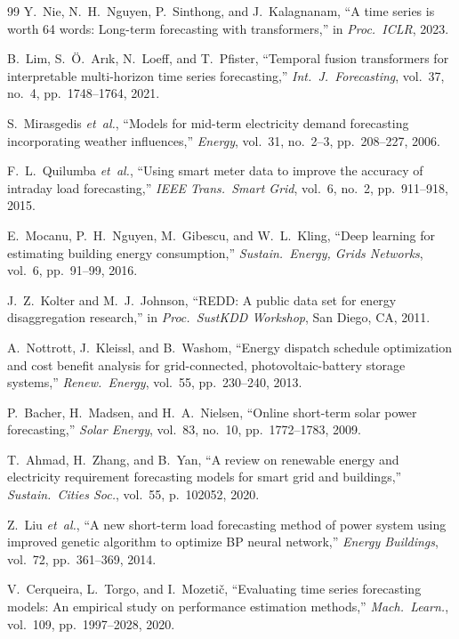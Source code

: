 \documentclass[12pt,a4paper]{article}
\begin{document}
\begin{thebibliography}{99}
Y.~Nie, N.~H.~Nguyen, P.~Sinthong, and J.~Kalagnanam, ``A time series is
worth 64 words: Long-term forecasting with transformers,'' in
\emph{Proc.~ICLR}, 2023.

B.~Lim, S.~{\"O}.~Ar{\i}k, N.~Loeff, and T.~Pfister, ``Temporal fusion
transformers for interpretable multi-horizon time series forecasting,''
\emph{Int.~J.~Forecasting}, vol.~37, no.~4, pp.~1748--1764, 2021.

S.~Mirasgedis \emph{et~al.}, ``Models for mid-term electricity demand
forecasting incorporating weather influences,'' \emph{Energy}, vol.~31,
no.~2--3, pp.~208--227, 2006.

F.~L.~Quilumba \emph{et~al.}, ``Using smart meter data to improve the accuracy
of intraday load forecasting,'' \emph{IEEE Trans.\ Smart Grid}, vol.~6, no.~2,
pp.~911--918, 2015.

E.~Mocanu, P.~H.~Nguyen, M.~Gibescu, and W.~L.~Kling, ``Deep learning for
estimating building energy consumption,'' \emph{Sustain.~Energy, Grids
Networks}, vol.~6, pp.~91--99, 2016.

J.~Z.~Kolter and M.~J.~Johnson, ``REDD: A public data set for energy
disaggregation research,'' in \emph{Proc.~SustKDD Workshop}, San Diego,
CA, 2011.

A.~Nottrott, J.~Kleissl, and B.~Washom, ``Energy dispatch schedule
optimization and cost benefit analysis for grid-connected, photovoltaic-battery
storage systems,'' \emph{Renew.~Energy}, vol.~55, pp.~230--240, 2013.

P.~Bacher, H.~Madsen, and H.~A.~Nielsen, ``Online short-term solar power
forecasting,'' \emph{Solar Energy}, vol.~83, no.~10, pp.~1772--1783, 2009.

T.~Ahmad, H.~Zhang, and B.~Yan, ``A review on renewable energy and electricity
requirement forecasting models for smart grid and buildings,''
\emph{Sustain.~Cities Soc.}, vol.~55, p.~102052, 2020.

Z.~Liu \emph{et~al.}, ``A new short-term load forecasting method of power
system using improved genetic algorithm to optimize BP neural network,''
\emph{Energy Buildings}, vol.~72, pp.~361--369, 2014.

V.~Cerqueira, L.~Torgo, and I.~Mozetič, ``Evaluating time series forecasting
models: An empirical study on performance estimation methods,''
\emph{Mach.~Learn.}, vol.~109, pp.~1997--2028, 2020.


\end{thebibliography}
\end{document}
